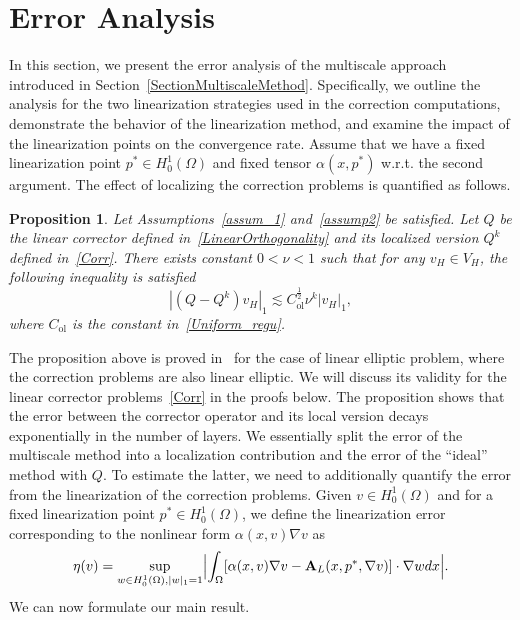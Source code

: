 \documentclass{article}
\newtheorem{prop}[theorem]{Proposition}
\begin{document}
 \section{Error Analysis}\label{SectionError}
 In this section, we present the error analysis of the multiscale approach introduced in Section~\ref{SectionMultiscaleMethod}. Specifically, we outline the analysis for the two linearization strategies used in the correction computations, demonstrate the behavior of the linearization method, and examine the impact of the linearization points on the convergence rate. Assume that we have a fixed linearization point $p^* \in H^1_0(\Omega) $ and fixed tensor $\alpha(x,p^*)$ w.r.t. the second argument. The effect of localizing the correction problems is quantified as follows.
 \begin{prop}\label{my_proposition}
   Let Assumptions~\ref{assum_1} and~\ref{assump2} be satisfied. Let $Q$ be the linear corrector defined in~\eqref{LinearOrthogonality} and its localized version $Q^k$ defined in~\eqref{Corr}. There exists constant $0<\nu<1$ such that for any $v_H \in V_H$, the following inequality is satisfied 
   \[|(Q-Q^k)v_H |_1\lesssim C_\mathrm{ol}^\frac{1}{2} \nu^k |v_H|_1,\]
   where $C_\mathrm{ol}$ is the constant in~\eqref{Uniform_regu}.
\end{prop}
The proposition above is proved in~\cite{LOD-Linear} for the case of linear elliptic problem, where the correction problems are also linear elliptic. We will discuss its validity for the linear corrector problems~\eqref{Corr} in the proofs below. 
The proposition shows that the error between the corrector operator and its local version decays exponentially in the number of layers. We essentially split the error of the multiscale method into a localization contribution and the error of the ``ideal'' method with $Q$. To estimate the latter, we need to additionally quantify the error from the linearization of the correction problems. Given $ v \in H_0^1(\Omega)$ and for a fixed linearization point $p^* \in H_0^1(\Omega)$, we define the linearization error corresponding to the nonlinear form $\alpha(x,v)\nabla v $ as 
\[\eta(v) = \sup_{w \in H_0^1(\Omega), |w|_1=1}\Bigl|\int_\Omega[\alpha(x,v)\nabla v-\mathbf{A}_L(x,p^*,\nabla v)]\cdot\nabla w dx\Bigr|.\]
We can now formulate our main result.
\end{document}
